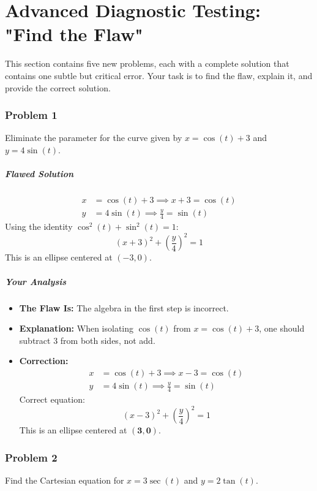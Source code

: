 \documentclass{article}
\begin{document}
\part*{Advanced Diagnostic Testing: "Find the Flaw"}

This section contains five new problems, each with a complete solution that contains one subtle but critical error. Your task is to find the flaw, explain it, and provide the correct solution.

\section{Problem 1}
Eliminate the parameter for the curve given by $x = \cos(t) + 3$ and $y = 4\sin(t)$.

\subsubsection*{Flawed Solution}
\begin{align*}
x &= \cos(t) + 3 \implies x + 3 = \cos(t) \\
y &= 4\sin(t) \implies \frac{y}{4} = \sin(t)
\end{align*}
Using the identity $\cos^2(t) + \sin^2(t) = 1$:
\[ (x+3)^2 + \left(\frac{y}{4}\right)^2 = 1 \]
This is an ellipse centered at $(-3, 0)$.

\subsubsection*{Your Analysis}
\begin{itemize}
    \item \textbf{The Flaw Is:} The algebra in the first step is incorrect.
    \item \textbf{Explanation:} When isolating $\cos(t)$ from $x = \cos(t) + 3$, one should subtract 3 from both sides, not add.
    \item \textbf{Correction:}
    \begin{align*}
    x &= \cos(t) + 3 \implies x - 3 = \cos(t) \\
    y &= 4\sin(t) \implies \frac{y}{4} = \sin(t)
    \end{align*}
    Correct equation:
    \[ (x-3)^2 + \left(\frac{y}{4}\right)^2 = 1 \]
    This is an ellipse centered at $\boldsymbol{(3, 0)}$.
\end{itemize}

\section{Problem 2}
Find the Cartesian equation for $x = 3\sec(t)$ and $y = 2\tan(t)$.
\end{document}
